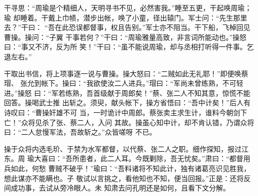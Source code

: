 干寻思：“周瑜是个精细人，天明寻书不见，必然害我。”睡至五更，干起唤周瑜；瑜
却睡着。干戴上巾帻，潜步出帐，唤了小童，径出辕门。军士问：“先生那里去？”干曰：
“吾在此恐误都督事，权且告别。”军士亦不阻当。干下船，飞棹回见曹操。操问：“子翼
干事若何？”干曰：“周瑜雅量高致，非言词所能动也。”操怒曰：“事又不济，反为所
笑！”干曰：“虽不能说周瑜，却与丞相打听得一件事。乞退左右。”

干取出书信，将上项事逐一说与曹操。操大怒曰：“二贼如此无礼耶！”即便唤蔡瑁、
张允到帐下。操曰：“我欲使汝二人进兵。”瑁曰：“军尚未曾练熟，不可轻进。”操怒
曰：“军若练熟，吾首级献于周郎矣！”蔡、张二人不知其意，惊慌不能回答。操喝武士推
出斩之。须臾，献头帐下，操方省悟曰：“吾中计矣！”后人有诗叹曰：“曹操奸雄不可
当，一时诡计中周郎。蔡张卖主求生计，谁料今朝剑下亡！”众将见杀了张、蔡二人，入问
其故。操虽心知中计，却不肯认错，乃谓众将曰：“二人怠慢军法，吾故斩之。”众皆嗟呀
不已。

操于众将内选毛玠、于禁为水军都督，以代蔡、张二人之职。细作探知，报过江东。周
瑜大喜曰：“吾所患者，此二人耳。今既剿除，吾无忧矣。”肃曰：“都督用兵如此，何愁
曹贼不破乎！”瑜曰：“吾料诸将不知此计，独有诸葛亮识见胜我，想此谋亦不能瞒也。子
敬试以言挑之，看他知也不知，便当回报。”正是：还将反间成功事，去试从旁冷眼人。未
知肃去问孔明还是如何，且看下文分解。
